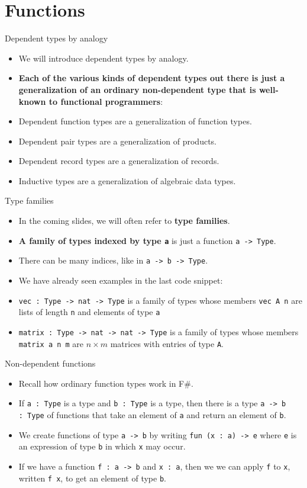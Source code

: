 \documentclass{beamer}
\newcommand{\m}[1]{\texttt{#1}}
\begin{document}
\section{Functions}

\begin{frame}{Dependent types by analogy}
\begin{itemize}
	\item We will introduce dependent types by analogy.
	\item \textbf{Each of the various kinds of dependent types out there is just a generalization of an ordinary non-dependent type that is well-known to functional programmers}:
	\item Dependent function types are a generalization of function types.
	\item Dependent pair types are a generalization of products.
	\item Dependent record types are a generalization of records.
	\item Inductive types are a generalization of algebraic data types.
\end{itemize}
\end{frame}

\begin{frame}{Type families}
\begin{itemize}
	\item In the coming slides, we will often refer to \textbf{type families}.
	\item \textbf{A family of types indexed by type \m{a}} is just a function \m{a -> Type}.
	\item There can be many indices, like in \m{a -> b -> Type}.
	\item We have already seen examples in the last code snippet:
	\item \m{vec :\ Type -> nat -> Type} is a family of types whose members \m{vec A n} are lists of length \m{n} and elements of type \m{a}
	\item \m{matrix :\ Type -> nat -> nat -> Type} is a family of types whose members \m{matrix a n m} are $n \times m$ matrices with entries of type \m{A}.
\end{itemize}
\end{frame}

\begin{frame}{Non-dependent functions}
\begin{itemize}
	\item Recall how ordinary function types work in F\#.
	\item If \m{a :\ Type} is a type and \m{b :\ Type} is a type, then there is a type \m{a -> b :\ Type} of functions that take an element of \m{a} and return an element of \m{b}.
	\item We create functions of type \m{a -> b} by writing \m{fun (x :\ a) -> e} where \m{e} is an expression of type \m{b} in which \m{x} may occur.
	\item If we have a function \m{f :\ a -> b} and \m{x :\ a}, then we we can apply \m{f} to \m{x}, written \m{f x}, to get an element of type \m{b}.
\end{itemize}
\end{frame}
\end{document}
